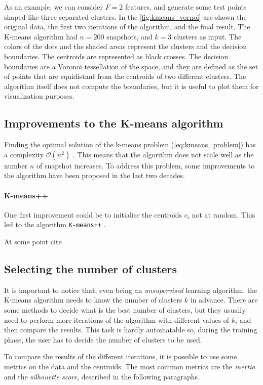 As an example, we can consider $F=2$ features, and generate some test points shaped like three separated clusters. In the \autoref{fig:kmeans_vornoi} are shown the original data, the first two iterations of the algorithm, and the final result. The K-means algorithm had $n=200$ snapshots, and $k=3$ clusters as input. The colors of the dots and the shaded areas represent the clusters and the decision boundaries. The centroids are represented as black crosses.
The decision boundaries are a Voronoi tessellation of the space, and they are defined as the set of points that are equidistant from the centroids of two different clusters. The algorithm itself does not compute the boundaries, but it is useful to plot them for visualization purposes.

\subsection{Improvements to the K-means algorithm}
\label{sec:kmeans_improvements}
Finding the optimal solution of the k-means problem (\autoref{eq:kmeans_problem}) has a complexity $\mathcal{O}(n^2)$ \cite{Kmeans_ologn}. This means that the algorithm does not scale well as the number $n$ of snapshot increases. To address this problem, some improvements to the algorithm have been proposed in the last two decades.

\paragraph{K-means++} One first improvement could be to initialise the centroids $c_i$ not at random. This led to the algorithm \texttt{K-means++} \cite{Kmeanspp}. 

At some point cite \cite{Kmeanspp}
\lipsum[1]

\subsection{Selecting the number of clusters}
It is important to notice that, even being an \emph{unsupervised} learning algorithm, the K-means algorithm needs to know the number of clusters $k$ in advance. There are some methods to decide what is the best number of clusters, but they usually need to perform more iterations of the algorithm with different values of $k$, and then compare the results. This task is hardly automatable so, during the training phase, the user has to decide the number of clusters to be used.

To compare the results of the different iterations, it is possible to use some metrics on the data and the centroids. The most common metrics are the \emph{inertia} and the \emph{silhouette score}, described in the following paragraphs.


